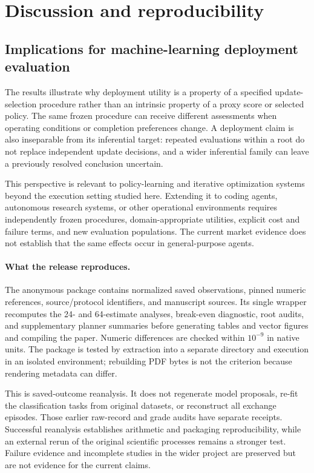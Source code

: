 \documentclass[10pt,letterpaper]{article}
\begin{document}
\section{Discussion and reproducibility}
\subsection{Implications for machine-learning deployment evaluation}
The results illustrate why deployment utility is a property of a specified update-selection procedure rather than an intrinsic property of a proxy score or selected policy. The same frozen procedure can receive different assessments when operating conditions or completion preferences change. A deployment claim is also inseparable from its inferential target: repeated evaluations within a root do not replace independent update decisions, and a wider inferential family can leave a previously resolved conclusion uncertain.

This perspective is relevant to policy-learning and iterative optimization systems beyond the execution setting studied here. Extending it to coding agents, autonomous research systems, or other operational environments requires independently frozen procedures, domain-appropriate utilities, explicit cost and failure terms, and new evaluation populations. The current market evidence does not establish that the same effects occur in general-purpose agents.

\paragraph{What the release reproduces.}
The anonymous package contains normalized saved observations, pinned numeric references, source/protocol identifiers, and manuscript sources. Its single wrapper recomputes the 24- and 64-estimate analyses, break-even diagnostic, root audits, and supplementary planner summaries before generating tables and vector figures and compiling the paper. Numeric differences are checked within $10^{-9}$ in native units. The package is tested by extraction into a separate directory and execution in an isolated environment; rebuilding PDF bytes is not the criterion because rendering metadata can differ.

This is saved-outcome reanalysis. It does not regenerate model proposals, re-fit the classification tasks from original datasets, or reconstruct all exchange episodes. Those earlier raw-record and grade audits have separate receipts. Successful reanalysis establishes arithmetic and packaging reproducibility, while an external rerun of the original scientific processes remains a stronger test. Failure evidence and incomplete studies in the wider project are preserved but are not evidence for the current claims.
\end{document}
